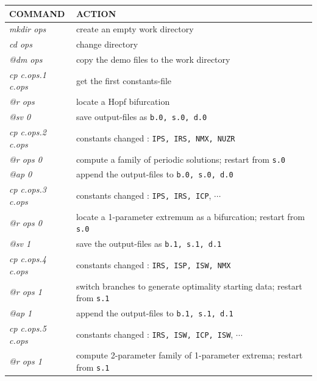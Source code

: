 \documentclass[12pt]{report}
\begin{document}
\begin{table}[htbp]
\begin{center}
\begin{tabular}{| l | l |}
\hline
  COMMAND  & ACTION \\
\hline
  {\it mkdir ops} & create an empty work directory \\ 
  {\it cd ops} & change directory \\
  {\it @dm ops} & copy the demo files to the work directory \\
\hline
  {\it cp c.ops.1 c.ops} & get the first constants-file \\ 
  {\it @r ops} & locate a Hopf bifurcation \\ 
  {\it @sv 0} & save output-files as {\tt b.0, s.0, d.0} \\ 
\hline
  {\it cp c.ops.2 c.ops} & constants changed : {\tt IPS, IRS, NMX, NUZR} \\ 
  {\it @r ops  0} & compute a family of periodic solutions;  restart from {\tt s.0} \\ 
  {\it @ap 0} & append the output-files to {\tt b.0, s.0, d.0} \\ 
\hline
  {\it cp c.ops.3 c.ops} & constants changed : {\tt IPS, IRS, ICP}, $\cdots$ \\ 
  {\it @r ops 0} & locate a 1-parameter extremum as a bifurcation; restart from {\tt s.0} \\ 
  {\it @sv 1} & save the output-files as {\tt b.1, s.1, d.1} \\ 
\hline
  {\it cp c.ops.4 c.ops} & constants changed : {\tt IRS, ISP, ISW, NMX} \\ 
  {\it @r ops 1} & switch branches to generate optimality starting data; restart from {\tt s.1} \\ 
  {\it @ap 1} & append the output-files to {\tt b.1, s.1, d.1} \\ 
\hline
  {\it cp c.ops.5 c.ops} & constants changed : {\tt IRS, ISW, ICP, ISW}, $\cdots$ \\ 
  {\it @r ops 1} & compute 2-parameter family of 1-parameter extrema; restart from {\tt s.1} \\ 

\end{tabular}
\end{center}
\end{table}
\end{document}
